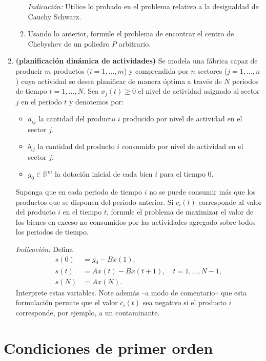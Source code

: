 \documentclass{article}
\begin{document}
\begin{enumerate}
\begin{enumerate}
			\textit{Indicación:} Utilice lo probado en el problema relativo a la desigualdad de Cauchy Schwarz.
		\item Usando lo anterior, formule el problema de encontrar el centro de Chebyshev de un poliedro \(P\) arbitrario.
	\end{enumerate}
	\item \textbf{(planificación dinámica de actividades)} Se modela una fábrica capaz de producir \(m\) productos (\(i = 1, \dots, m\)) y comprendida por \(n\) sectores (\(j=1, \dots, n\)) cuya actividad se desea planificar de manera óptima a través de \(N\) periodos de tiempo \(t = 1, \dots, N\). Sea \(x_j(t) \geq 0\) el nivel de actividad asignado al sector \(j\) en el periodo \(t\) y denotemos por:
		\begin{itemize}
			\item \(a_{ij}\) la cantidad del producto \(i\) producido por nivel de actividad en el sector \(j\).
			\item \(b_{ij}\) la cantidad del producto \(i\) consumido por nivel de actividad en el sector \(j\).
			\item \(g_0 \in \mathbb{R}^m\) la dotación inicial de cada bien \(i\) para el tiempo \(0\).
		\end{itemize}
		Suponga que en cada periodo de tiempo \(i\) no se puede consumir más que los productos que se disponen del periodo anterior. Si \(c_i(t)\) corresponde al valor del producto \(i\) en el tiempo \(t\), formule el problema de maximizar el valor de los bienes en exceso no consumidos por las actividades agregado sobre todos los periodos de tiempo.

		\textit{Indicación:} Defina
		\begin{align*}
			s(0) &= g_0 - B x(1), \\
			s(t) &= Ax(t) - Bx(t+1), \quad t = 1, \dots, N-1, \\
			s(N) &= Ax(N).
		\end{align*}
		Interprete estas variables. Note además --a modo de comentario-- que esta formulación permite que el valor \(c_i(t)\) sea negativo si el producto \(i\) corresponde, por ejemplo, a un contaminante.

\end{enumerate}

\section{Condiciones de primer orden}
\end{document}
